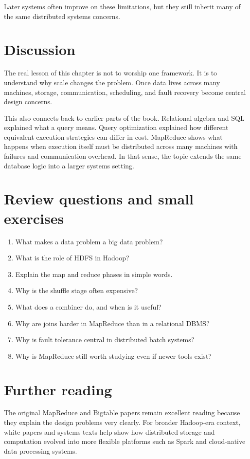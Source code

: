 \documentclass[11pt,a4paper,openany]{book}
\begin{document}
Later systems often improve on these limitations, but they still inherit many of the same distributed systems concerns.

\section{Discussion}
The real lesson of this chapter is not to worship one framework. It is to understand why scale changes the problem. Once data lives across many machines, storage, communication, scheduling, and fault recovery become central design concerns.

This also connects back to earlier parts of the book. Relational algebra and SQL explained what a query means. Query optimization explained how different equivalent execution strategies can differ in cost. MapReduce shows what happens when execution itself must be distributed across many machines with failures and communication overhead. In that sense, the topic extends the same database logic into a larger systems setting.

\section{Review questions and small exercises}
\begin{enumerate}
\item What makes a data problem a big data problem?
\item What is the role of HDFS in Hadoop?
\item Explain the map and reduce phases in simple words.
\item Why is the shuffle stage often expensive?
\item What does a combiner do, and when is it useful?
\item Why are joins harder in MapReduce than in a relational DBMS?
\item Why is fault tolerance central in distributed batch systems?
\item Why is MapReduce still worth studying even if newer tools exist?
\end{enumerate}

\section{Further reading}
The original MapReduce and Bigtable papers remain excellent reading because they explain the design problems very clearly. For broader Hadoop-era context, white papers and systems texts help show how distributed storage and computation evolved into more flexible platforms such as Spark and cloud-native data processing systems.
\end{document}
